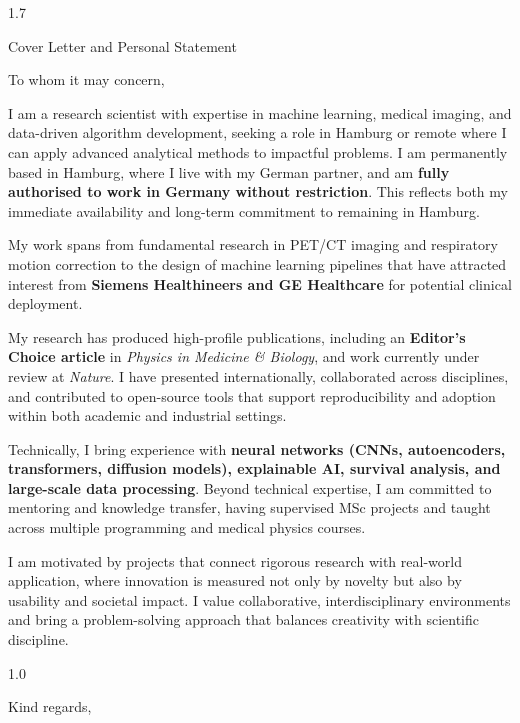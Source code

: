 \documentclass{cv}
\begin{document}
    \begin{spacing}{1.7}
        \begin{rSection}{Cover Letter and Personal Statement}
            \item To whom it may concern,

            \item I am a research scientist with expertise in machine learning, medical imaging, and data-driven algorithm development, seeking a role in Hamburg or remote where I can apply advanced analytical methods to impactful problems. I am permanently based in Hamburg, where I live with my German partner, and am \textbf{fully authorised to work in Germany without restriction}. This reflects both my immediate availability and long-term commitment to remaining in Hamburg.

            \item My work spans from fundamental research in PET/CT imaging and respiratory motion correction to the design of machine learning pipelines that have attracted interest from \textbf{Siemens Healthineers and GE Healthcare} for potential clinical deployment.

            \item My research has produced high-profile publications, including an \textbf{Editor’s Choice article} in \textit{Physics in Medicine \& Biology}, and work currently under review at \textit{Nature}. I have presented internationally, collaborated across disciplines, and contributed to open-source tools that support reproducibility and adoption within both academic and industrial settings.

            \item Technically, I bring experience with \textbf{neural networks (CNNs, autoencoders, transformers, diffusion models), explainable AI, survival analysis, and large-scale data processing}. Beyond technical expertise, I am committed to mentoring and knowledge transfer, having supervised MSc projects and taught across multiple programming and medical physics courses.

            \item I am motivated by projects that connect rigorous research with real-world application, where innovation is measured not only by novelty but also by usability and societal impact. I value collaborative, interdisciplinary environments and bring a problem-solving approach that balances creativity with scientific discipline.
            
            \begin{spacing}{1.0}
                \begin{rSubsection}{}{}{}{}
                    \item Kind regards,
            

\end{rSubsection}
\end{spacing}
\end{rSection}
\end{spacing}
\end{document}
